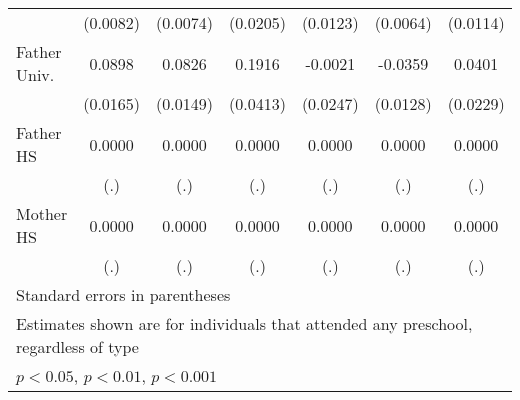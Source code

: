 \begin{table}[htbp]
\begin{tabular}{l*{6}{c}}
            &    (0.0082)         &    (0.0074)         &    (0.0205)         &    (0.0123)         &    (0.0064)         &    (0.0114)         \\
\addlinespace
Father Univ.&      0.0898\sym{***}&      0.0826\sym{***}&      0.1916\sym{***}&     -0.0021         &     -0.0359\sym{**} &      0.0401         \\
            &    (0.0165)         &    (0.0149)         &    (0.0413)         &    (0.0247)         &    (0.0128)         &    (0.0229)         \\
\addlinespace
Father HS   &      0.0000         &      0.0000         &      0.0000         &      0.0000         &      0.0000         &      0.0000         \\
            &         (.)         &         (.)         &         (.)         &         (.)         &         (.)         &         (.)         \\
\addlinespace
Mother HS   &      0.0000         &      0.0000         &      0.0000         &      0.0000         &      0.0000         &      0.0000         \\
            &         (.)         &         (.)         &         (.)         &         (.)         &         (.)         &         (.)         \\
\bottomrule
\multicolumn{7}{l}{\footnotesize Standard errors in parentheses}\\
\multicolumn{7}{l}{\footnotesize Estimates shown are for individuals that attended any preschool, regardless of type}\\
\multicolumn{7}{l}{\footnotesize \sym{*} \(p<0.05\), \sym{**} \(p<0.01\), \sym{***} \(p<0.001\)}\\
\end{tabular}
\end{table}
